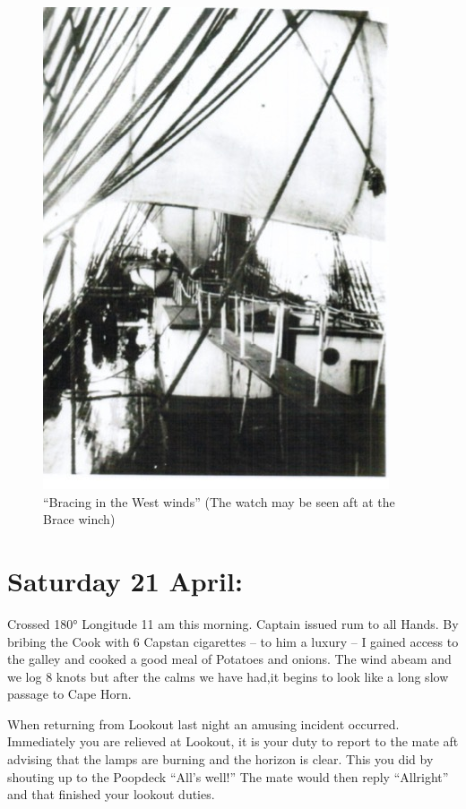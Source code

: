 \documentclass[
  11pt,
  msmallroyalvopaper
]{memoir}
\begin{document}
\begin{figure}
\centering
\includegraphics{./images/image007.jpg}
\caption{``Bracing in the West winds'' (The watch may be seen aft at the
Brace winch)}
\end{figure}

\hypertarget{saturday-21-april}{%
\section{Saturday 21 April:}\label{saturday-21-april}}

Crossed 180° Longitude 11 am this morning. Captain issued rum to all
Hands. By bribing the Cook with 6 Capstan cigarettes -- to him a luxury
-- I gained access to the galley and cooked a good meal of Potatoes and
onions. The wind abeam and we log 8 knots but after the calms we have
had,it begins to look like a long slow passage to Cape Horn.

When returning from Lookout last night an amusing incident occurred.
Immediately you are relieved at Lookout, it is your duty to report to
the mate aft advising that the lamps are burning and the horizon is
clear. This you did by shouting up to the Poopdeck ``All's well!'' The
mate would then reply ``Allright'' and that finished your lookout
duties.
\end{document}
